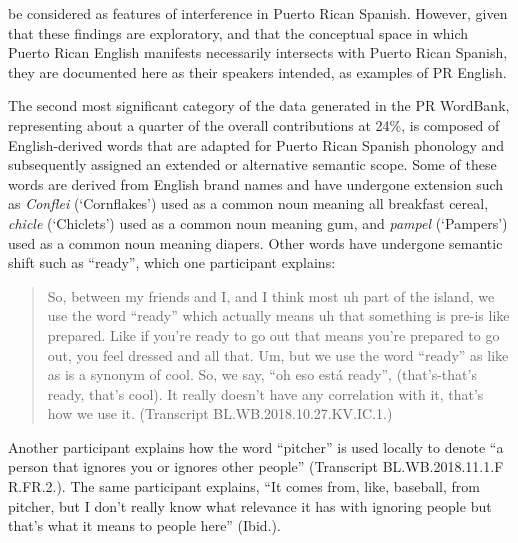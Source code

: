 \documentclass[output=paper,colorlinks,citecolor=brown]{langscibook}
\begin{document}
{be considered as features of interference in Puerto Rican Spanish. However, given that these findings are exploratory, and that the conceptual space in which Puerto Rican English manifests necessarily intersects with Puerto Rican Spanish, they are documented here as their speakers intended, as examples of PR English.} 

The second most significant category of the data generated in the PR WordBank, representing about a quarter of the overall contributions at 24\%, is composed of English-derived words that are adapted for Puerto Rican Spanish phonology and subsequently assigned an extended or alternative semantic scope. Some of these words are derived from English brand names and have undergone extension such as \emph{Conflei} (‘Cornflakes’) used as a common noun meaning all breakfast cereal, \emph{chicle} (‘Chiclets’) used as a common noun meaning gum, and \emph{pampel} (‘Pampers’) used as a common noun meaning diapers. Other words have undergone semantic shift such as “ready”, which one participant explains:

\begin{quote}
    So, between my friends and I, and I think most uh part of the island, we use the word “ready” which actually means uh that something is pre-is like prepared. Like if you’re ready to go out that means you’re prepared to go out, you feel dressed and all that. Um, but we use the word “ready” as like as is a synonym of cool. So, we say, “oh eso está ready”, (that’s-that’s ready, that’s cool). It really doesn’t have any correlation with it, that’s how we use it. (Transcript BL.WB.2018.10.27.KV.IC.1.)
\end{quote}

Another participant explains how the word “pitcher” is used locally to denote “a person that ignores you or ignores other people” (Transcript BL.WB.2018.11.1.F R.FR.2.). The same participant explains, “It comes from, like, baseball, from pitcher, but I don’t really know what relevance it has with ignoring people but that's what it means to people here” (Ibid.).
\end{document}
